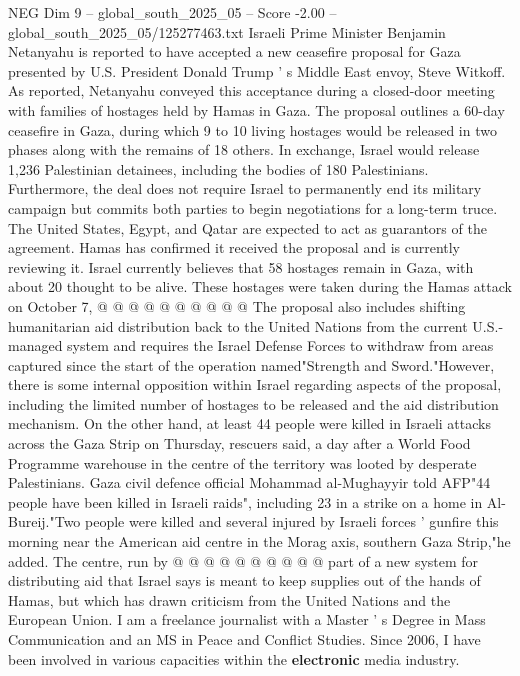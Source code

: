 \begin{textsample}{NEG Dim 9 – global\_south\_2025\_05 – Score -2.00 – global\_south\_2025\_05/125277463.txt}  \label{ex:f9_neg_249}
Israeli Prime Minister Benjamin Netanyahu is reported to have accepted a new ceasefire proposal for Gaza presented by U.S.
President Donald Trump ' s Middle East envoy, Steve Witkoff.
As reported, Netanyahu conveyed this acceptance during a closed-door meeting with families of hostages held by Hamas in Gaza.
The proposal outlines a 60-day ceasefire in Gaza, during which 9 to 10 living hostages would be released in two phases along with the remains of 18 others.
In exchange, Israel would release 1,236 Palestinian detainees, including the bodies of 180 Palestinians.
Furthermore, the deal does not require Israel to permanently end its military campaign but commits both parties to begin negotiations for a long-term truce.
The United States, Egypt, and Qatar are expected to act as guarantors of the agreement.
Hamas has confirmed it received the proposal and is currently reviewing it.
Israel currently believes that 58 hostages remain in Gaza, with about 20 thought to be alive.
These hostages were taken during the Hamas attack on October 7, @ @ @ @ @ @ @ @ @ @ The proposal also includes shifting humanitarian aid distribution back to the United Nations from the current U.S.-managed system and requires the Israel Defense Forces to withdraw from areas captured since the start of the operation named"Strength and Sword."However, there is some internal opposition within Israel regarding aspects of the proposal, including the limited number of hostages to be released and the aid distribution mechanism.
On the other hand, at least 44 people were killed in Israeli attacks across the Gaza Strip on Thursday, rescuers said, a day after a World Food Programme warehouse in the centre of the territory was looted by desperate Palestinians.
Gaza civil defence official Mohammad al-Mughayyir told AFP"44 people have been killed in Israeli raids", including 23 in a strike on a home in Al-Bureij."Two people were killed and several injured by Israeli forces ' gunfire this morning near the American aid centre in the Morag axis, southern Gaza Strip,"he added.
The centre, run by @ @ @ @ @ @ @ @ @ @ part of a new system for distributing aid that Israel says is meant to keep supplies out of the hands of Hamas, but which has drawn criticism from the United Nations and the European Union.
I am a freelance journalist with a Master ' s Degree in Mass Communication and an MS in Peace and Conflict Studies.
Since 2006, I have been involved in various capacities within the \textbf{electronic} media industry.

\end{textsample}
